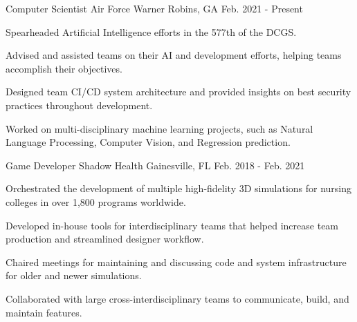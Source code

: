 \documentclass[11pt, a4paper]{awesome-cv}
\begin{document}
\begin{cventries}

  \cventry
    {Computer Scientist} %
    {Air Force} %
    {Warner Robins, GA} %
    {Feb. 2021 - Present} %
    {
      \begin{cvitems} %
        \item {Spearheaded Artificial Intelligence efforts in the 577th of the DCGS.}
        \item {Advised and assisted teams on their AI and development efforts, helping teams accomplish their objectives.}
        \item {Designed team CI/CD system architecture and provided insights on best security practices throughout development.}
        \item {Worked on multi-disciplinary machine learning projects, such as Natural Language Processing, Computer Vision, and Regression prediction.}
      \end{cvitems}
    }

  \cventry
    {Game Developer} %
    {Shadow Health} %
    {Gainesville, FL} %
    {Feb. 2018 - Feb. 2021} %
    {
      \begin{cvitems} %
        \item {Orchestrated the development of multiple high-fidelity 3D simulations for nursing colleges in over 1,800 programs worldwide.}
        \item {Developed in-house tools for interdisciplinary teams that helped increase team production and streamlined designer workflow.}
        \item {Chaired meetings for maintaining and discussing code and system infrastructure for older and newer simulations.}
        \item {Collaborated with large cross-interdisciplinary teams to communicate, build, and maintain features.}
      \end{cvitems}
    }

\end{cventries}
\end{document}

